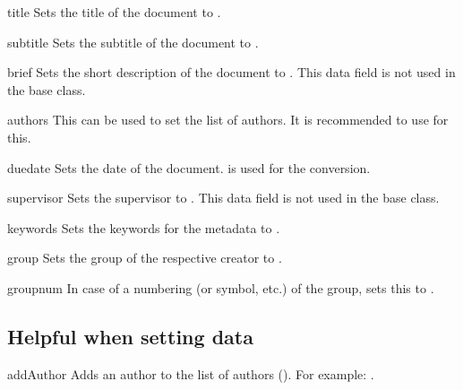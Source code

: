 \documentclass{sopra-base}
\begin{document}
\begin{command}{title}{}
    Sets the title of the document to .
\end{command}

\begin{command}{subtitle}{}
    Sets the subtitle of the document to .
\end{command}

\begin{command}{brief}{}
    Sets the short description of the document to .
    This data field is not used in the base class.
\end{command}

\begin{command}{authors}{}
    This can be used to set the list of authors. It is recommended
    to use  for this.
\end{command}

\begin{command}{duedate}{}
   Sets the date of the document.  is used
   for the conversion.
\end{command}

\begin{command}{supervisor}{}
    Sets the supervisor to . This data field is not used in the base class.
\end{command}

\begin{command}{keywords}{}
    Sets the keywords for the metadata to .
\end{command}

\begin{command}{group}{}
    Sets the group of the respective creator to .
\end{command}

\begin{command}{groupnum}{}
    In case of a numbering (or symbol, etc.) of the group, sets this
    to .
\end{command}

\subsection{Helpful when setting data}
\begin{command}{addAuthor}{}
    Adds an author to the list of authors (). For
    example: .
\end{command}
\end{document}

